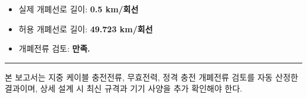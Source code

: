 \documentclass[11pt,a4paper]{article}
\begin{document}
\begin{summarybox}
\begin{itemize}[leftmargin=6mm, itemsep=2pt, topsep=4pt]
\item 실제 개폐선로 길이: \textbf{0.5 km/회선}
\item 허용 개폐선로 길이: \textbf{49.723 km/회선}
\item 개폐전류 검토: \textbf{만족.}
\end{itemize}
\end{summarybox}

\vfill
{\color{brandgold}\rule{\textwidth}{0.6pt}}

{\small\color{brandtext}
본 보고서는 지중 케이블 충전전류, 무효전력, 정격 충전 개폐전류 검토를 자동 산정한 결과이며, 상세 설계 시 최신 규격과 기기 사양을 추가 확인해야 한다.
}
\end{document}
